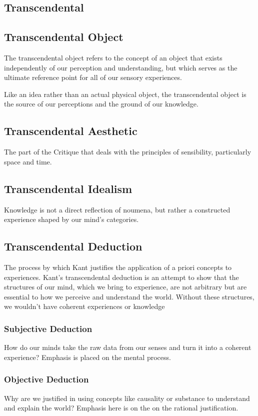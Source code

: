 \documentclass[a4paper]{article}
\begin{document}
\subsection{Transcendental}

\subsection{Transcendental Object}
The transcendental object refers to the concept of an object that exists independently of our perception and understanding, 
but which serves as the ultimate reference point for all of our sensory experiences.

Like an idea rather than an actual physical object, the transcendental object is the source of our perceptions and the ground of our knowledge.

\subsection{Transcendental Aesthetic}
The part of the Critique that deals with the principles of sensibility, particularly space and time.

\subsection{Transcendental Idealism}
Knowledge is not a direct reflection of noumena, but rather a constructed experience shaped by our mind's categories.

\subsection{Transcendental Deduction}
The process by which Kant justifies the application of a priori concepts to experiences.
Kant's transcendental deduction is an attempt to show that the structures of our mind, which we bring to experience, are not arbitrary but are essential to how we perceive and understand the world. 
Without these structures, we wouldn't have coherent experiences or knowledge

\subsubsection{Subjective Deduction}
How do our minds take the raw data from our senses and turn it into a coherent experience? 
Emphasis is placed on the mental process.

\subsubsection{Objective Deduction}
Why are we justified in using concepts like causality or substance to understand and explain the world? 
Emphasis here is on the on the rational justification.
\end{document}
